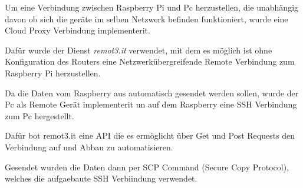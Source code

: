 Um eine Verbindung zwischen Raspberry Pi und Pc herzustellen, 
die unabhängig davon ob sich die geräte im selben 
Netzwerk befinden funktioniert, wurde eine Cloud Proxy Verbindung 
implementerit.

Dafür wurde der Dienst \textit{remot3.it} \cite{remoteit} verwendet, 
mit dem es möglich ist ohne Konfiguration des Routers eine
Netzwerkübergreifende Remote Verbindung zum Raspberry Pi herzustellen.

Da die Daten vom Raspberry aus automatisch gesendet werden sollen, 
wurde der Pc als Remote Gerät implementerit un auf dem Raspberry 
eine SSH Verbindung zum Pc hergestellt.


\begin{figure}[H]
    \centering
    \def\svgwidth{0.7\textwidth}
    
    \caption{}
    \label{}
\end{figure}


Dafür bot remot3.it eine API die es ermöglicht über Get und Post Requests
den Verbindung auf und Abbau zu automatisieren.

Gesendet wurden die Daten dann per SCP Command (Secure Copy Protocol), 
welches die aufgaebaute SSH Verbiindung verwendet.













% 

%         
%     
%     


%







